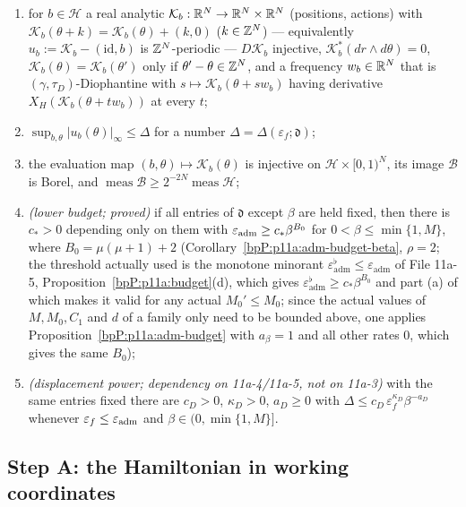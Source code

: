 \begin{definition}
\begin{enumerate}[label=(K\arabic*)]
\item for $b\in\mathcal H$ a real analytic $\mathcal K_b:\mathbb{R}^N\to\mathbb{R}^N\times\mathbb{R}^N$ (positions, actions) with $\mathcal K_b(\theta+k)=\mathcal K_b(\theta)+(k,0)$ ($k\in\mathbb{Z}^N$) --- equivalently $u_b:=\mathcal K_b-(\mathrm{id},b)$ is $\mathbb{Z}^N$-periodic --- $D\mathcal K_b$ injective, $\mathcal K_b^*(dr\wedge d\theta)=0$, $\mathcal K_b(\theta)=\mathcal K_b(\theta')$ only if $\theta'-\theta\in\mathbb{Z}^N$, and a frequency $w_b\in\mathbb{R}^N$ that is $(\gamma,\tau_D)$-Diophantine with $s\mapsto\mathcal K_b(\theta+sw_b)$ having derivative $X_H(\mathcal K_b(\theta+tw_b))$ at every $t$;
\item $\sup_{b,\theta}\lvert u_b(\theta)\rvert_\infty\le\Delta$ for a number $\Delta=\Delta(\varepsilon_f;\mathfrak d)$;
\item the evaluation map $(b,\theta)\mapsto\mathcal K_b(\theta)$ is injective on $\mathcal H\times[0,1)^N$, its image $\mathcal B$ is Borel, and $\operatorname{meas}\mathcal B\ge2^{-2N}\operatorname{meas}\mathcal H$;
\item \emph{(lower budget; proved)} if all entries of $\mathfrak d$ except $\beta$ are held fixed, then there is $c_*>0$ depending only on them with $\varepsilon_{\rm adm}\ge c_*\beta^{B_0}$ for $0<\beta\le\min\{1,M\}$, where $B_0=\mu(\mu+1)+2$ (Corollary~\ref{bpP:p11a:adm-budget-beta}, $\rho=2$; the threshold actually used is the monotone minorant $\varepsilon^\flat_{\mathrm{adm}}\le\varepsilon_{\mathrm{adm}}$ of File 11a-5, Proposition~\ref{bpP:p11a:budget}(d), which gives $\varepsilon^\flat_{\mathrm{adm}}\ge c_*\beta^{B_0}$ and part (a) of which makes it valid for any actual $M_0'\le M_0$; since the actual values of $M,M_0,C_1$ and $d$ of a family only need to be bounded above, one applies Proposition~\ref{bpP:p11a:adm-budget} with $a_\beta=1$ and all other rates $0$, which gives the same $B_0$);
\item \emph{(displacement power; dependency on 11a-4/11a-5, not on 11a-3)} with the same entries fixed there are $c_D>0$, $\kappa_D>0$, $a_D\ge0$ with $\Delta\le c_D\,\varepsilon_f^{\kappa_D}\beta^{-a_D}$ whenever $\varepsilon_f\le\varepsilon_{\rm adm}$ and $\beta\in(0,\min\{1,M\}]$.
\end{enumerate}
\end{definition}

\subsection{Step A: the Hamiltonian in working coordinates}\label{bpP:p11:sec-A}

